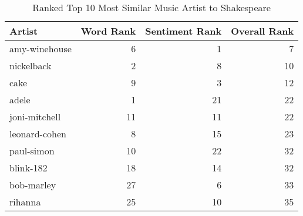\begin{table}[ht]
\centering
\begin{tabular}{lrrr}
  \hline
Artist & Word Rank & Sentiment Rank & Overall Rank \\ 
  \hline
amy-winehouse &   6 &   1 &   7 \\ 
  nickelback &   2 &   8 &  10 \\ 
  cake &   9 &   3 &  12 \\ 
  adele &   1 &  21 &  22 \\ 
  joni-mitchell &  11 &  11 &  22 \\ 
  leonard-cohen &   8 &  15 &  23 \\ 
  paul-simon &  10 &  22 &  32 \\ 
  blink-182 &  18 &  14 &  32 \\ 
  bob-marley &  27 &   6 &  33 \\ 
  rihanna &  25 &  10 &  35 \\ 
   \hline
\end{tabular}
\caption{Ranked Top 10 Most Similar Music Artist to Shakespeare} 
\label{tab:overallranktable}
\end{table}


